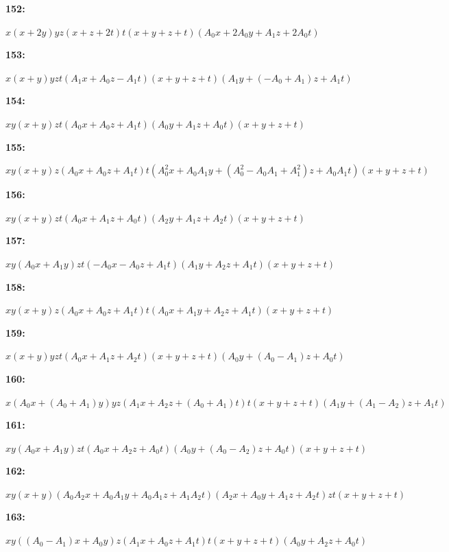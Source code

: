 \documentclass[12pt]{amsart}
\theoremstyle{plain}
\theoremstyle{remark}
\theoremstyle{definition}
\numberwithin{table}{section}
\begin{document}
\noindent\parbox[right]{9mm}{\textbf{152:}}\parbox{3mm}{\hfill}%
\parbox[t]{15cm}{\(x(x + 2y)yz(x + z + 2t)t(x + y + z + t)(A_{0}x + 2A_{0}y + A_{1}z + 2A_{0}t)\)}

\noindent\parbox[right]{9mm}{\textbf{153:}}\parbox{3mm}{\hfill}%
\parbox[t]{15cm}{\(x(x + y)yzt(A_{1}x + A_{0}z - A_{1}t)(x + y + z + t)(A_{1}y + (-A_{0} + A_{1})z + A_{1}t)\)}

\noindent\parbox[right]{9mm}{\textbf{154:}}\parbox{3mm}{\hfill}%
\parbox[t]{15cm}{\(xy(x + y)zt(A_{0}x + A_{0}z + A_{1}t)(A_{0}y + A_{1}z + A_{0}t)(x + y + z + t)\)}

\noindent\parbox[right]{9mm}{\textbf{155:}}\parbox{3mm}{\hfill}%
\parbox[t]{15cm}{\(xy(x + y)z(A_{0}x + A_{0}z + A_{1}t)t(A_{0}^2x + A_{0}A_{1}y + (A_{0}^2 - A_{0}A_{1} + A_{1}^2)z + A_{0}A_{1}t)(x + y + z + t)\)}

\noindent\parbox[right]{9mm}{\textbf{156:}}\parbox{3mm}{\hfill}%
\parbox[t]{15cm}{\(xy(x + y)zt(A_{0}x + A_{1}z + A_{0}t)(A_{2}y + A_{1}z + A_{2}t)(x + y + z + t)\)}

\noindent\parbox[right]{9mm}{\textbf{157:}}\parbox{3mm}{\hfill}%
\parbox[t]{15cm}{\(xy(A_{0}x + A_{1}y)zt(-A_{0}x - A_{0}z + A_{1}t)(A_{1}y + A_{2}z + A_{1}t)(x + y + z + t)\)}

\noindent\parbox[right]{9mm}{\textbf{158:}}\parbox{3mm}{\hfill}%
\parbox[t]{15cm}{\(xy(x + y)z(A_{0}x + A_{0}z + A_{1}t)t(A_{0}x + A_{1}y + A_{2}z + A_{1}t)(x + y + z + t)\)}

\noindent\parbox[right]{9mm}{\textbf{159:}}\parbox{3mm}{\hfill}%
\parbox[t]{15cm}{\(x(x + y)yzt(A_{0}x + A_{1}z + A_{2}t)(x + y + z + t)(A_{0}y + (A_{0} - A_{1})z + A_{0}t)\)}

\noindent\parbox[right]{9mm}{\textbf{160:}}\parbox{3mm}{\hfill}%
\parbox[t]{15cm}{\(x(A_{0}x + (A_{0} + A_{1})y)yz(A_{1}x + A_{2}z + (A_{0} + A_{1})t)t(x + y + z + t)(A_{1}y + (A_{1} - A_{2})z + A_{1}t)\)}

\noindent\parbox[right]{9mm}{\textbf{161:}}\parbox{3mm}{\hfill}%
\parbox[t]{15cm}{\(xy(A_{0}x + A_{1}y)zt(A_{0}x + A_{2}z + A_{0}t)(A_{0}y + (A_{0} - A_{2})z + A_{0}t)(x + y + z + t)\)}

\noindent\parbox[right]{9mm}{\textbf{162:}}\parbox{3mm}{\hfill}%
\parbox[t]{15cm}{\(xy(x + y)(A_{0}A_{2}x + A_{0}A_{1}y + A_{0}A_{1}z + A_{1}A_{2}t)(A_{2}x + A_{0}y + A_{1}z + A_{2}t)zt(x + y + z + t)\)}

\noindent\parbox[right]{9mm}{\textbf{163:}}\parbox{3mm}{\hfill}%
\parbox[t]{15cm}{\(xy((A_{0} - A_{1})x + A_{0}y)z(A_{1}x + A_{0}z + A_{1}t)t(x + y + z + t)(A_{0}y + A_{2}z + A_{0}t)\)}
\end{document}
